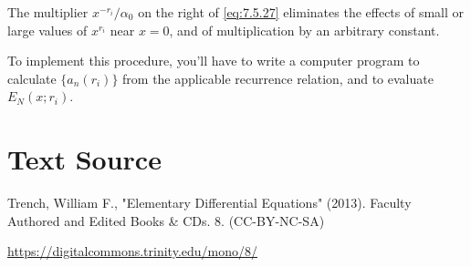 \documentclass{ximera}
\begin{document}
The multiplier $x^{-r_i}/\alpha_0$ on the right of \eqref{eq:7.5.27}
eliminates the effects of small or large values of $x^{r_i}$ near
$x=0$, and of multiplication by an arbitrary constant. 


To implement this procedure, you'll have to write a computer program to
calculate $\{a_n(r_i)\}$ from the applicable recurrence relation, and
to evaluate $E_N(x;r_i)$.




\section*{Text Source}
Trench, William F., "Elementary Differential Equations" (2013). Faculty Authored and Edited Books \& CDs. 8. (CC-BY-NC-SA)

\href{https://digitalcommons.trinity.edu/mono/8/}{https://digitalcommons.trinity.edu/mono/8/}
\end{document}
